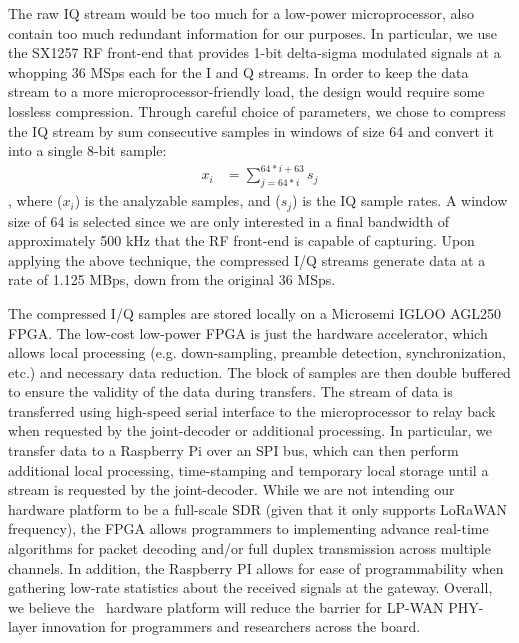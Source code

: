 
 The raw IQ stream would be too much for a low-power microprocessor, also contain too much redundant information for our purposes. In particular, we use the SX1257 RF front-end that provides 1-bit delta-sigma modulated signals at a whopping 36 MSps each for the I and Q streams.  In order to keep the data stream to a more microprocessor-friendly load, the design would require some lossless compression. Through careful choice of parameters, we chose to compress the IQ stream by sum consecutive samples in windows of size 64 and convert it into a single 8-bit sample: 
\begin{align*}
x_i &= \sum_{j=64*i}^{64*i + 63} s_j
\end{align*}
, where ($x_i$) is the analyzable samples, and ($s_j$) is the IQ sample rates. A window size of 64 is selected since we are only interested in a final
bandwidth of approximately 500 kHz that the RF front-end is capable of
capturing. Upon applying the above technique, the compressed I/Q streams generate data at a rate of 1.125 MBps, down from the original 36 MSps. \vspace*{0.1in}


 The compressed I/Q samples are stored locally on a Microsemi IGLOO AGL250 FPGA. The low-cost low-power FPGA is just the hardware accelerator, which allows local processing (e.g. down-sampling, preamble detection, synchronization, etc.) and necessary data reduction.  The block of samples are then double buffered to ensure the validity of the data during transfers. The stream of data is transferred using high-speed serial interface to the microprocessor to relay back when requested by the joint-decoder or additional processing. In particular, we transfer data to a Raspberry Pi over an SPI bus, which can then perform additional local processing, time-stamping and temporary local storage until a stream is requested by the joint-decoder. While we are not intending our hardware platform to be a full-scale SDR (given that it only supports LoRaWAN frequency), the FPGA allows programmers to implementing advance real-time algorithms for packet decoding and/or full duplex transmission across multiple channels. In addition, the Raspberry PI allows for ease of programmability when gathering low-rate statistics about the received signals at the gateway. Overall, we believe the \name\ hardware platform will reduce the barrier for LP-WAN PHY-layer innovation for programmers and researchers across the board. 

